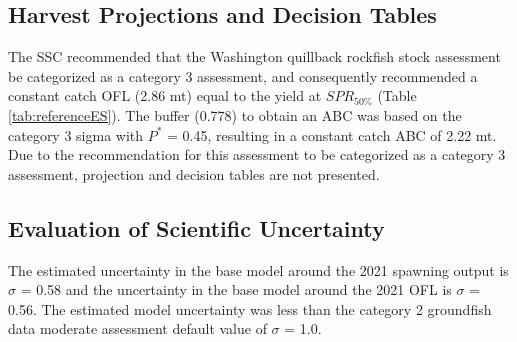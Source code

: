 \documentclass[11pt,
  english,
  letterpaper,
]{article}
\begin{document}
\leavevmode\tagmcend\tagstructend\par


\hypertarget{harvest-projections-and-decision-tables}{%
\subsection{Harvest Projections and Decision Tables}\label{harvest-projections-and-decision-tables}}

\leavevmode\tagmcend\tagstructend


The SSC recommended that the Washington quillback rockfish stock assessment be categorized as a category 3 assessment, and consequently recommended a constant catch OFL (2.86 mt) equal to the yield at {\(SPR_{50\%}\)\leavevmode\tagmcend\tagstructend} (Table \ref{tab:referenceES}). The buffer (0.778) to obtain an ABC was based on the category 3 sigma with {\(P^*\)\leavevmode\tagmcend\tagstructend} = 0.45, resulting in a constant catch ABC of 2.22 mt. Due to the recommendation for this assessment to be categorized as a category 3 assessment, projection and decision tables are not presented.

\leavevmode\tagmcend\tagstructend\par


\hypertarget{evaluation-of-scientific-uncertainty}{%
\subsection{Evaluation of Scientific Uncertainty}\label{evaluation-of-scientific-uncertainty}}

\leavevmode\tagmcend\tagstructend


The estimated uncertainty in the base model around the 2021 spawning output is {\(\sigma\)\leavevmode\tagmcend\tagstructend} = 0.58 and the uncertainty in the base model around the 2021 OFL is {\(\sigma\)\leavevmode\tagmcend\tagstructend} = 0.56. The estimated model uncertainty was less than the category 2 groundfish data moderate assessment default value of {\(\sigma\)\leavevmode\tagmcend\tagstructend} = 1.0.
\end{document}
